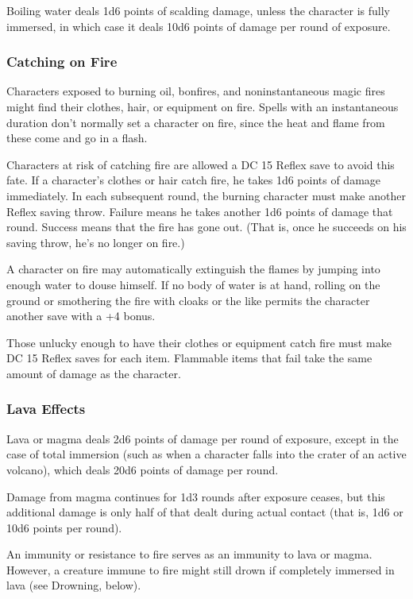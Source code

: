 \documentclass{article}
\begin{document}
Boiling water deals 1d6 points of scalding damage, unless the character is fully 
immersed, in which case it deals 10d6 points of damage per round of exposure.

\subsubsection*{\textbf{Catching on Fire}}

Characters exposed to burning oil, bonfires, and noninstantaneous magic fires\textit{ 
}might find their clothes, hair, or equipment on fire. Spells with an instantaneous 
duration\textit{ }don't normally set a character on fire, since the heat and flame 
from these come and go in a flash.

Characters at risk of catching fire are allowed a DC 15 Reflex save to avoid this 
fate. If a character's clothes or hair catch fire, he takes 1d6 points of damage 
immediately. In each subsequent round, the burning character must make another 
Reflex saving throw. Failure means he takes another 1d6 points of damage that round. 
Success means that the fire has gone out. (That is, once he succeeds on his saving 
throw, he's no longer on fire.)

A character on fire may automatically extinguish the flames by jumping into enough 
water to douse himself. If no body of water is at hand, rolling on the ground or 
smothering the fire with cloaks or the like permits the character another save 
with a +4 bonus.

Those unlucky enough to have their clothes or equipment catch fire must make DC 
15 Reflex saves for each item. Flammable items that fail take the same amount of 
damage as the character.

\subsubsection*{\textbf{Lava Effects}}

Lava or magma deals 2d6 points of damage per round of exposure, except in the case 
of total immersion (such as when a character falls into the crater of an active 
volcano), which deals 20d6 points of damage per round.

Damage from magma continues for 1d3 rounds after exposure ceases, but this additional 
damage is only half of that dealt during actual contact (that is, 1d6 or 10d6 points 
per round).

An immunity or resistance to fire serves as an immunity to lava or magma. However, 
a creature immune to fire might still drown if completely immersed in lava (see 
Drowning, below).
\end{document}
